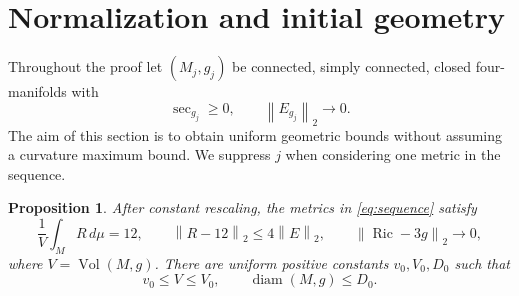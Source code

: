 \documentclass[11pt]{article}
\newtheorem{proposition}[theorem]{Proposition}
\theoremstyle{definition}
\theoremstyle{remark}
\numberwithin{equation}{section}
\DeclareMathOperator{\Ric}{Ric}
\DeclareMathOperator{\Vol}{Vol}
\DeclareMathOperator{\diam}{diam}
\newcommand{\dd}{\,d\mu}
\newcommand{\norm}[1]{\left\lVert #1\right\rVert}
\begin{document}
\section{Normalization and initial geometry}
\label{sec:initial}

Throughout the proof let $(M_j,g_j)$ be connected, simply connected,
closed four-manifolds with
\begin{equation}\label{eq:sequence}
 \sec_{g_j}\ge0,\qquad \norm{E_{g_j}}_2\longrightarrow0.
\end{equation}
The aim of this section is to obtain uniform geometric bounds without
assuming a curvature maximum bound. We suppress $j$ when considering
one metric in the sequence.

\begin{proposition}\label{prop:initial}
After constant rescaling, the metrics in \eqref{eq:sequence} satisfy
\begin{equation}\label{eq:normalization}
 \frac1V\int_M R\dd=12,\qquad
 \norm{R-12}_2\le4\norm E_2,\qquad
 \norm{\Ric-3g}_2\longrightarrow0,
\end{equation}
where $V=\Vol(M,g)$. There are uniform positive constants
$v_0,V_0,D_0$ such that
\begin{equation}\label{eq:initial-geometry}
 v_0\le V\le V_0,\qquad \diam(M,g)\le D_0.
\end{equation}
\end{proposition}
\end{document}
